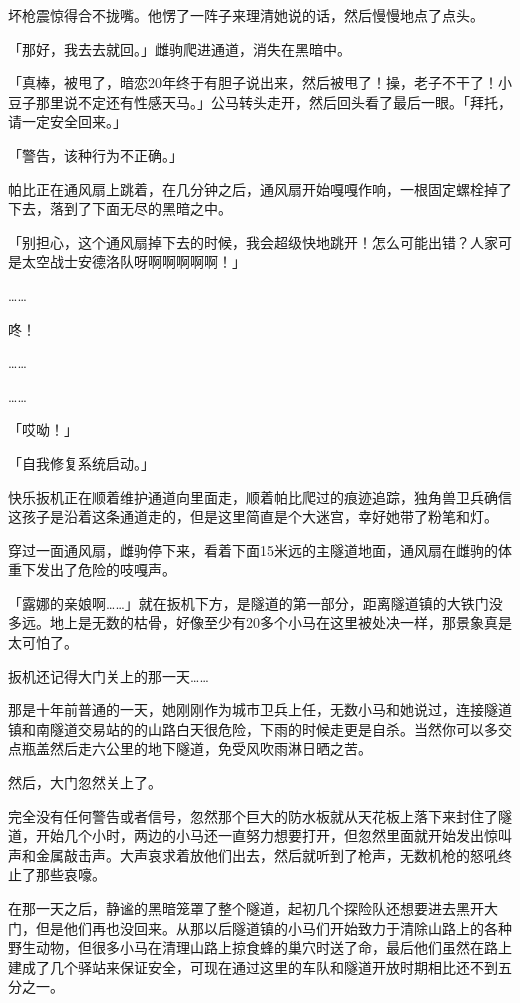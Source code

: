 坏枪震惊得合不拢嘴。他愣了一阵子来理清她说的话，然后慢慢地点了点头。

「那好，我去去就回。」雌驹爬进通道，消失在黑暗中。

「真棒，被甩了，暗恋20年终于有胆子说出来，然后被甩了！操，老子不干了！小豆子那里说不定还有性感天马。」公马转头走开，然后回头看了最后一眼。「拜托，请一定安全回来。」

\horizonline


「{\mt 警告，该种行为不正确。}」

帕比正在通风扇上跳着，在几分钟之后，通风扇开始嘎嘎作响，一根固定螺栓掉了下去，落到了下面无尽的黑暗之中。

「别担心，这个通风扇掉下去的时候，我会超级快地跳开！怎么可能出错？人家可是太空战士安德洛队呀啊啊啊啊啊！」

……

咚！

……

……

「哎呦！」

「{\mt 自我修复系统启动。}」

\horizonline


快乐扳机正在顺着维护通道向里面走，顺着帕比爬过的痕迹追踪，独角兽卫兵确信这孩子是沿着这条通道走的，但是这里简直是个大迷宫，幸好她带了粉笔和灯。

穿过一面通风扇，雌驹停下来，看着下面15米远的主隧道地面，通风扇在雌驹的体重下发出了危险的吱嘎声。

「露娜的亲娘啊……」就在扳机下方，是隧道的第一部分，距离隧道镇的大铁门没多远。地上是无数的枯骨，好像至少有20多个小马在这里被处决一样，那景象真是太可怕了。

扳机还记得大门关上的那一天……

那是十年前普通的一天，她刚刚作为城市卫兵上任，无数小马和她说过，连接隧道镇和南隧道交易站的的山路白天很危险，下雨的时候走更是自杀。当然你可以多交点瓶盖然后走六公里的地下隧道，免受风吹雨淋日晒之苦。

然后，大门忽然关上了。

完全没有任何警告或者信号，忽然那个巨大的防水板就从天花板上落下来封住了隧道，开始几个小时，两边的小马还一直努力想要打开，但忽然里面就开始发出惊叫声和金属敲击声。大声哀求着放他们出去，然后就听到了枪声，无数机枪的怒吼终止了那些哀嚎。

在那一天之后，静谧的黑暗笼罩了整个隧道，起初几个探险队还想要进去黑开大门，但是他们再也没回来。从那以后隧道镇的小马们开始致力于清除山路上的各种野生动物，但很多小马在清理山路上掠食蜂的巢穴时送了命，最后他们虽然在路上建成了几个驿站来保证安全，可现在通过这里的车队和隧道开放时期相比还不到五分之一。

